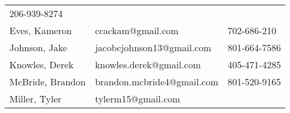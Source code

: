 \documentclass[]{auvsi_doc}
\begin{document}
\begin{longtable}[]{@{}lll@{}}
\begin{minipage}[t]{0.30\columnwidth}
{206-939-8274}\strut
\end{minipage}\tabularnewline
\begin{minipage}[t]{0.30\columnwidth}\raggedright\strut
{Eves, Kameron}\strut
\end{minipage} & \begin{minipage}[t]{0.30\columnwidth}\raggedright\strut
{ccackam@gmail.com}\strut
\end{minipage} & \begin{minipage}[t]{0.30\columnwidth}\raggedright\strut
{702-686-210}\strut
\end{minipage}\tabularnewline
\begin{minipage}[t]{0.30\columnwidth}\raggedright\strut
{Johnson, Jake}\strut
\end{minipage} & \begin{minipage}[t]{0.30\columnwidth}\raggedright\strut
{jacobcjohnson13@gmail.com}\strut
\end{minipage} & \begin{minipage}[t]{0.30\columnwidth}\raggedright\strut
{801-664-7586}\strut
\end{minipage}\tabularnewline
\begin{minipage}[t]{0.30\columnwidth}\raggedright\strut
{Knowles, Derek}\strut
\end{minipage} & \begin{minipage}[t]{0.30\columnwidth}\raggedright\strut
{knowles.derek@gmail.com}\strut
\end{minipage} & \begin{minipage}[t]{0.30\columnwidth}\raggedright\strut
{405-471-4285}\strut
\end{minipage}\tabularnewline
\begin{minipage}[t]{0.30\columnwidth}\raggedright\strut
{McBride, Brandon}\strut
\end{minipage} & \begin{minipage}[t]{0.30\columnwidth}\raggedright\strut
{brandon.mcbride4@gmail.com}\strut
\end{minipage} & \begin{minipage}[t]{0.30\columnwidth}\raggedright\strut
{801-520-9165}\strut
\end{minipage}\tabularnewline
\begin{minipage}[t]{0.30\columnwidth}\raggedright\strut
{Miller, Tyler}\strut
\end{minipage} & \begin{minipage}[t]{0.30\columnwidth}\raggedright\strut
{tylerm15@gmail.com}\strut
\end{minipage} & \begin{minipage}[t]{0.30\columnwidth}\raggedright\strut

\end{minipage}
\end{longtable}
\end{document}
